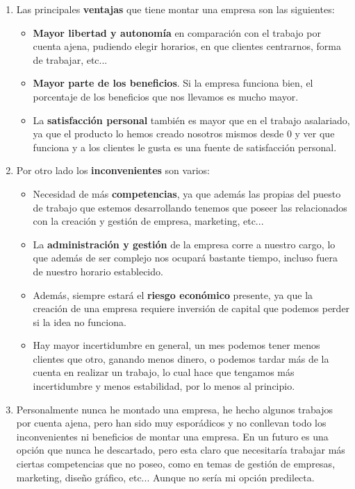 \begin{enumerate}[label={(\alph*)}]
    \item Las principales \textbf{ventajas} que tiene montar una empresa son las siguientes:
    \begin{itemize}
        \item \textbf{Mayor libertad y autonomía} en comparación con el trabajo por cuenta ajena, pudiendo elegir horarios, en que clientes centrarnos, forma de trabajar, etc...
        \item \textbf{Mayor parte de los beneficios}. Si la empresa funciona bien, el porcentaje de los beneficios que nos llevamos es mucho mayor.
        \item La \textbf{satisfacción personal} también es mayor que en el trabajo asalariado, ya que el producto lo hemos creado nosotros mismos desde 0 y ver que funciona y a los clientes le gusta es una fuente de satisfacción personal.
    \end{itemize}
    \item Por otro lado los \textbf{inconvenientes} son varios:
    \begin{itemize}
        \item Necesidad de más \textbf{competencias}, ya que además las propias del puesto de trabajo que estemos desarrollando tenemos que poseer las relacionados con la creación y gestión de empresa, marketing, etc...
        \item La \textbf{administración y gestión} de la empresa corre a nuestro cargo, lo que además de ser complejo nos ocupará bastante tiempo, incluso fuera de nuestro horario establecido.
        \item Además, siempre estará el \textbf{riesgo económico} presente, ya que la creación de una empresa requiere inversión de capital que podemos perder si la idea no funciona.
        \item Hay mayor {incertidumbre} en general, un mes podemos tener menos clientes que otro, ganando menos dinero, o podemos tardar más de la cuenta en realizar un trabajo, lo cual hace que tengamos más incertidumbre y menos estabilidad, por lo menos al principio.
    \end{itemize}
    \item Personalmente nunca he montado una empresa, he hecho algunos trabajos por cuenta ajena, pero han sido muy esporádicos y no conllevan todo los inconvenientes ni beneficios de montar una empresa. En un futuro es una opción que nunca he descartado, pero esta claro que necesitaría trabajar más ciertas competencias que no poseo, como en temas de gestión de empresas, marketing, diseño gráfico, etc... Aunque no sería mi opción predilecta.
\end{enumerate}











\newpage




